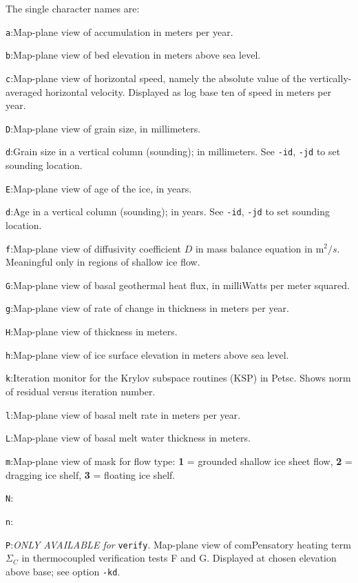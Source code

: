 \documentclass[11pt,final]{amsart}
\renewcommand{\t}[1]{\texttt{#1}}
\begin{document}
The single character names are:

\verb|a|:\quad Map-plane view of accumulation in meters per year.

\verb|b|:\quad Map-plane view of bed elevation in meters above sea level.

\verb|c|:\quad Map-plane view of horizontal speed, namely the absolute value of the vertically-averaged horizontal velocity.  Displayed as log base ten of speed in meters per year.

\verb|D|:\quad Map-plane view of grain size, in millimeters.

\verb|d|:\quad Grain size in a vertical column (sounding); in millimeters.  See \verb|-id|, \verb|-jd| to set sounding location.

\verb|E|:\quad Map-plane view of age of the ice, in years.

\verb|d|:\quad Age in a vertical column (sounding); in years.  See \verb|-id|, \verb|-jd| to set sounding location.

\verb|f|:\quad Map-plane view of diffusivity coefficient $D$ in mass balance equation in $\text{m}^2/s$.  Meaningful only in regions of shallow ice flow.

\verb|G|:\quad Map-plane view of basal geothermal heat flux, in milliWatts per meter squared.

\verb|g|:\quad Map-plane view of rate of change in thickness in meters per year.

\verb|H|:\quad Map-plane view of thickness in meters.

\verb|h|:\quad Map-plane view of ice surface elevation in meters above sea level.

\verb|k|:\quad Iteration monitor for the Krylov subspace routines (KSP) in Petsc.  Shows norm of residual versus iteration number.

\verb|l|:\quad Map-plane view of basal melt rate in meters per year.

\verb|L|:\quad Map-plane view of basal melt water thickness in meters.

\verb|m|:\quad Map-plane view of mask for flow type:  \textbf{1} = grounded shallow ice sheet flow,  \textbf{2} = dragging ice shelf, \textbf{3} = floating ice shelf.

\verb|N|:\quad

\verb|n|:\quad

\verb|P|:\quad \emph{ONLY AVAILABLE for }\t{verify}.  Map-plane view of comPensatory heating term $\Sigma_C$ in thermocoupled verification tests F and G.  Displayed at chosen elevation above base; see option \verb|-kd|.
\end{document}
